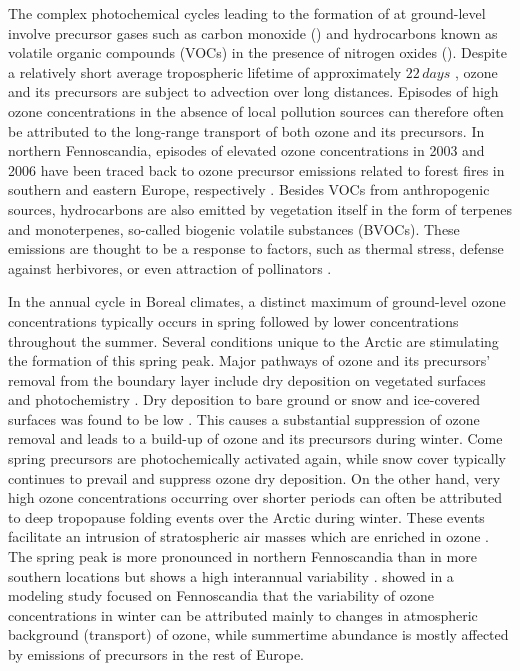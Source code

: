 \documentclass[bg, manuscript]{copernicus}
\begin{document}
The complex photochemical cycles leading to the formation of  at ground-level involve precursor gases such as carbon monoxide () and hydrocarbons known as volatile organic compounds (VOCs) in the presence of nitrogen oxides (). Despite a relatively short average tropospheric lifetime of approximately $22\,\unit{days}$ \citep{JGR:Stevenson2005,ACP:Young2013}, ozone and its precursors are subject to advection over long distances. Episodes of high ozone concentrations in the absence of local pollution sources can therefore often be attributed to the long-range transport of both ozone and its precursors. In northern Fennoscandia, episodes of elevated ozone concentrations in 2003 and 2006 have been traced back to ozone precursor emissions related to forest fires in southern and eastern Europe, respectively \citep{AE:Lindskog2007,EP:Karlsson2013}. Besides VOCs from anthropogenic sources, hydrocarbons are also emitted by vegetation itself in the form of terpenes and monoterpenes, so-called biogenic volatile substances (BVOCs). These emissions are thought to be a response to factors, such as thermal stress, defense against herbivores, or even attraction of pollinators \citep{TPS:Penuelas2003}. 

In the annual cycle in Boreal climates, a distinct maximum of ground-level ozone concentrations typically occurs in spring followed by lower concentrations throughout the summer. Several conditions unique to the Arctic are stimulating the formation of this spring peak. Major pathways of ozone and its precursors' removal from the boundary layer include dry deposition on vegetated surfaces and photochemistry \citep{RG:Clifton2020}. Dry deposition to bare ground or snow and ice-covered surfaces was found to be low \citep{ACP:Helmig2007}. This causes a  substantial suppression of ozone removal \citep{AE:Monks2000} and leads to a build-up of ozone and its precursors during winter. Come spring precursors are photochemically activated again, while snow cover typically continues to prevail and suppress ozone dry deposition.
On the other hand, very high ozone concentrations occurring over shorter periods can often be attributed to deep tropopause folding events over the Arctic during winter. These events facilitate an intrusion of stratospheric air masses which are enriched in ozone \citep{JGR:Skerlak2015}.
The spring peak is more pronounced in northern Fennoscandia than in more southern locations but shows a high interannual variability \citep{AB:Klingberg2009, BER:Klingberg2019}. \citet{ACP:Andersson2017} showed in a modeling study focused on Fennoscandia that the variability of ozone concentrations in winter can be attributed mainly to changes in atmospheric background (transport) of ozone, while summertime abundance is mostly affected by emissions of precursors in the rest of Europe.
\end{document}
